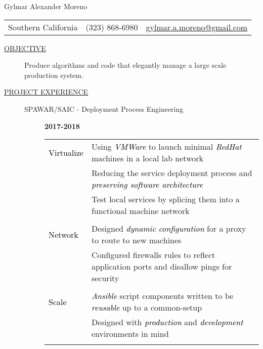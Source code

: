\documentclass[12pt]{article}
\begin{document}
    \begin{center}
        {\LARGE Gylmar Alexander Moreno}
	\\
        \begin{tabular}{l|l|l}
            Southern California & (323) 868-6980 &
            \href{mailto:gylmar.a.moreno@gmail.com}{gylmar.a.moreno@gmail.com}
        \end{tabular}
    \end{center}

    \begin{description}
        \item[\underline{OBJECTIVE}] Produce algorithms and code that elegantly manage a large scale production system.
            \iffalse Produce algorithms and code that elegantly manage a large scale production system that\fi
        \item[\underline{PROJECT EXPERIENCE}] \hfill
            \begin{description}
                \item[SPAWAR/SAIC - Deployment Process Engineering] \hfill \textbf{2017-2018}\\
		\textcolor{gray}{
			\begin{tabular}{l|l}
					    \\[-1.0mm]
				\textcolor{black}{Virtualize} & Using \textcolor{black}{\textit{VMWare}} to launch minimal \textcolor{black}{\textit{RedHat}} machines in a local lab network\\
					   & Reducing the service deployment process and \textcolor{black}{\textit{preserving software architecture}}\\
					   & Test local services by splicing them into a functional machine network\\
					    \\[-1.7mm]
				\textcolor{black}{Network}	   & Designed \textcolor{black}{\textit{dynamic configuration}} for a proxy to route to new machines\\
					   & Configured firewalls rules to reflect application ports and disallow pings for security\\
					    \\[-1.7mm]
				\textcolor{black}{Scale}   & \textcolor{black}{\textit{Ansible}} script components written to be \textcolor{black}{\textit{reusable}} up to a common-setup\\
					   & Designed with \textcolor{black}{\textit{production}} and \textcolor{black}{\textit{development}} environments in mind\\
					    \\[-1.0mm]
		    	\end{tabular}
	    	}


\end{description}
\end{description}
\end{document}
